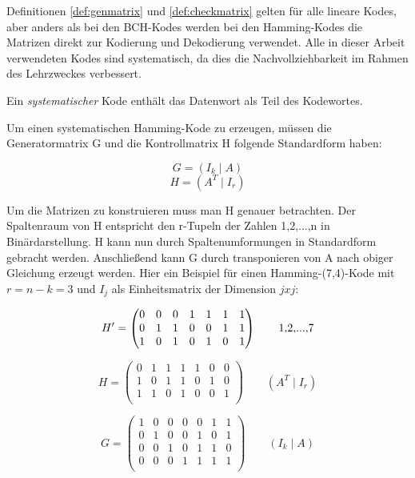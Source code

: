 Definitionen \ref{def:genmatrix} und \ref{def:checkmatrix} gelten für alle lineare Kodes\cite[S. 3ff]{huffman2010fundamentals}, aber anders als bei den BCH-Kodes werden bei den Hamming-Kodes die Matrizen direkt zur Kodierung und Dekodierung verwendet.
\newblock
Alle in dieser Arbeit verwendeten Kodes sind systematisch, da dies die Nachvollziehbarkeit im Rahmen des Lehrzweckes verbessert. 

\begin{t_def}
Ein {\em systematischer} Kode enthält das Datenwort als Teil des Kodewortes.
\end{t_def}

Um einen systematischen Hamming-Kode zu erzeugen, müssen die Generatormatrix G und die Kontrollmatrix H folgende Standardform\cite[S. 8ff]{morelos2006art} haben: 

$$G = \left(I_k \mid A\right)$$
$$H = \left(A^T \mid I_r\right)$$

Um die Matrizen zu konstruieren muss man H genauer betrachten. Der Spaltenraum von H entspricht den r-Tupeln der Zahlen 1,2,...,n in Binärdarstellung. H kann nun durch Spaltenumformungen in Standardform gebracht werden. 
Anschließend kann G durch transponieren von A nach obiger Gleichung erzeugt werden.\cite[S. 29]{huffman2010fundamentals} Hier ein Beispiel für einen Hamming-(7,4)-Kode mit $r = n-k = 3$ und $I_j$ als Einheitsmatrix der Dimension $j x j$:

$$H' = \begin{pmatrix}
0 & 0 & 0 & 1 & 1 & 1 & 1 \\
0 & 1 & 1 & 0 & 0 & 1 & 1 \\
1 & 0 & 1 & 0 & 1 & 0 & 1 \\
\end{pmatrix}\text{\qquad{1,2,...,7}}$$

$$H = \begin{pmatrix}
0 & 1 & 1 & 1 & 1 & 0 & 0 \\
1 & 0 & 1 & 1 & 0 & 1 & 0 \\
1 & 1 & 0 & 1 & 0 & 0 & 1 \\
\end{pmatrix}\qquad{(A^T \mid I_r)}$$

$$G = \begin{pmatrix}
1 & 0 & 0 & 0 & 0 & 1 & 1 \\
0 & 1 & 0 & 0 & 1 & 0 & 1 \\
0 & 0 & 1 & 0 & 1 & 1 & 0 \\
0 & 0 & 0 & 1 & 1 & 1 & 1 \\
\end{pmatrix}\qquad{(I_k \mid A)}$$

